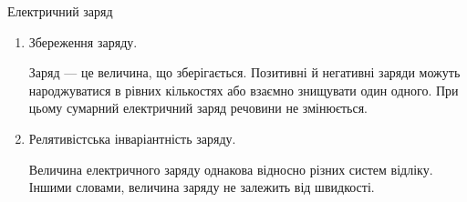 \documentclass{beamer}
\begin{document}
\begin{frame}{Електричний заряд}
\begin{onlyenv}
\begin{enumerate}
			\item Збереження заряду.

			      \begin{flushleft}\small
				      Заряд --- це величина, що \alert{зберігається}. Позитивні й негативні заряди можуть народжуватися в рівних кількостях або взаємно
				      знищувати один одного. При цьому сумарний електричний заряд речовини не змінюється.
			      \end{flushleft}
			\item Релятивістська інваріантність заряду.

			      \begin{flushleft}\small
				      Величина електричного заряду однакова відносно різних систем відліку. Іншими словами, величина заряду не залежить від швидкості.
			      \end{flushleft}
		\end{enumerate}
	\end{onlyenv}
\end{frame}
\end{document}
